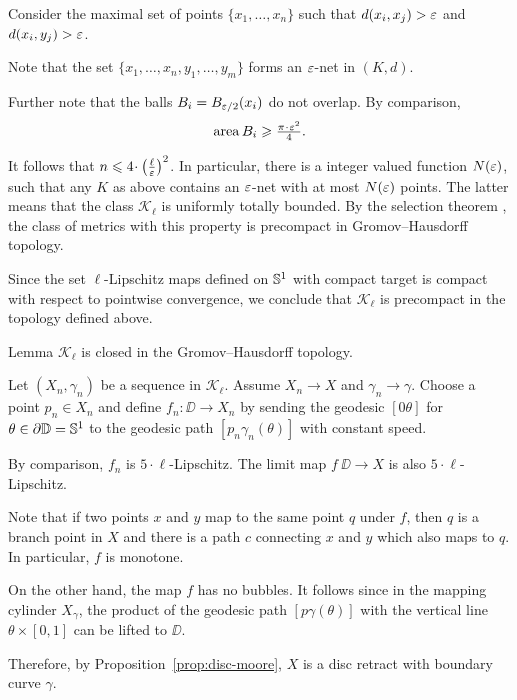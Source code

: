 Consider the maximal set of points $\{x_1,\dots,x_n\}$ such that $d(x_i,x_j)>\varepsilon$ and $d(x_i,y_j)>\varepsilon$.

Note that the set $\{x_1,\dots,x_n,y_1,\dots,y_m\}$
forms an $\varepsilon$-net in $(K,d)$.

Further note that the balls $B_i=B_{\varepsilon/2}(x_i)$
do not overlap.
By comparison,
\[\area B_i\ge \tfrac{\pi\cdot\eps^2}{4}.\]

It follows that $n\le 4\cdot\left(\tfrac\ell\eps\right)^2$.
In particular, there is a integer valued function $N(\varepsilon)$, such that any  
$K$ as above contains an $\varepsilon$-net
with at most $N(\varepsilon)$ points.
The latter means that the class $\mathcal{K}_\ell$ is uniformly totally bounded.
By the selection theorem \cite[7.4.15]{BBI}, the class of metrics with this property is precompact in Gromov--Hausdorff topology.

Since the set $\ell$-Lipschitz maps defined on $\mathbb{S}^1$ with compact target is compact with respect to pointwise convergence, we conclude that $\mathcal{K}_\ell$ is precompact in the topology defined above. 
\qeds





\begin{thm}{Lemma}\label{lem:closed}
$\mathcal{K}_\ell$ is closed in the Gromov--Hausdorff topology.
\end{thm}

Let $(X_n,\gamma_n)$ be a sequence in $\mathcal{K}_\ell$.
Assume $X_n\to X$ and $\gamma_n\to\gamma$. 
Choose a point $p_n\in X_n$ and define
$f_n:\DD\to X_n$ by sending the geodesic $[0\theta]$ for $\theta\in\partial \mathbb{D}=\mathbb{S}^1$ to the geodesic path $[p_n\gamma_n(\theta)]$ with constant speed. 

By comparison, $f_n$ is $5\cdot\ell$-Lipschitz. %
The limit map $f\:\DD\to X$ is also $5\cdot\ell$-Lipschitz.

Note that if two points $x$  and $y$ map to the same point $q$ under $f$, then $q$ is a branch point in $X$ and there is a path $c$ connecting 
$x$ and $y$ which also maps to $q$. 
In particular, $f$ is monotone.

On the other hand, the map $f$ has no bubbles.
It follows since in the mapping cylinder $X_\gamma$, the product of the geodesic path $[p\gamma(\theta)]$ with the vertical line $\theta\times [0,1]$ can be lifted to $\DD$.

Therefore, by Proposition~\ref{prop:disc-moore}, $X$ is a disc retract with boundary curve $\gamma$.
\qeds
